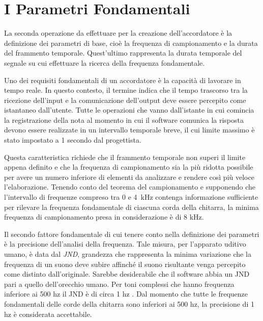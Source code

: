 \chapter{I Parametri Fondamentali}\label{cap:parametri}

La seconda operazione da effettuare per la creazione dell'accordatore è la definizione dei parametri di base, cioè la frequenza di campionamento e la durata del frammento temporale.
Quest'ultimo rappresenta la durata temporale del segnale su cui effettuare la ricerca della frequenza fondamentale.  

Uno dei requisiti fondamentali di un accordatore è la capacità di lavorare in tempo reale. 
In questo contesto, il termine indica che il tempo trascorso tra la ricezione dell'input e la comunicazione dell'output deve essere percepito come istantaneo dall'utente. 
Tutte le operazioni che vanno dall'istante in cui comincia la registrazione della nota al momento in cui il software comunica la risposta devono essere realizzate in un intervallo temporale breve, il cui limite massimo è stato impostato a 1 secondo dal progettista. 

Questa caratteristica richiede che il frammento temporale non superi il limite appena definito e che la frequenza di campionamento sia la più ridotta possibile per avere un numero inferiore di elementi da analizzare e rendere così più veloce l'elaborazione.
Tenendo conto del teorema del campionamento e supponendo che l'intervallo di frequenze compreso tra 0 e \mbox{4 kHz} contenga informazione sufficiente per rilevare la frequenza fondamentale di ciascuna corda della chitarra, la minima frequenza di campionamento presa in considerazione è di 8 kHz.

Il secondo fattore fondamentale di cui tenere conto nella definizione dei parametri è la precisione dell'analisi della frequenza.
Tale misura, per l'apparato uditivo umano, è data dal \emph{JND}, grandezza che rappresenta la minima variazione che la frequenza di un suono deve subire affinché il suono risultante venga percepito come distinto dall'originale.
Sarebbe desiderabile che il software abbia un \mbox{JND} pari a quello dell'orecchio umano. 
Per toni complessi che hanno frequenza inferiore ai 500 hz il \mbox{JND} è di circa 1 hz \cite{BenestySondhiHuang2008}. 
Dal momento che tutte le frequenze fondamentali delle corde della chitarra sono inferiori ai 500 hz, la precisione di 1 hz è considerata accettabile.

